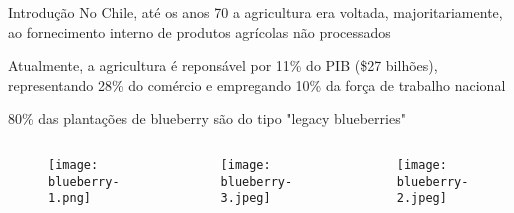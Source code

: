 \begin{frame}[t]{Introdução} 
    \newcommand\vspaceintro{0.2cm}
    \transdissolve[duration=0.5]
    No Chile, até os anos 70 a agricultura era voltada, majoritariamente, ao fornecimento interno de produtos agrícolas não processados \cite{blueberryrecognition}\vspace{\vspaceintro}
    
    Atualmente, a agricultura é reponsável por 11\% do PIB (\$27 bilhões), representando 28\% do comércio e empregando 10\% da força de trabalho nacional\cite{ChilePIB:online} \vspace{\vspaceintro} 

    80\% das plantações de blueberry são do tipo "legacy blueberries"
    \vspace{-0.4cm}
    \begin{columns}[t]
        \begin{center}
                \begin{figure}
                    \texttt{[image: blueberry-1.png]}
                \end{figure}
        \end{center}

        \begin{center}
                \begin{figure}
                    \texttt{[image: blueberry-3.jpeg]}
                \end{figure}
        \end{center}

        \begin{center}
                \begin{figure}
                    \texttt{[image: blueberry-2.jpeg]}
                \end{figure}
        \end{center}

    \end{columns}

    

\end{frame}

